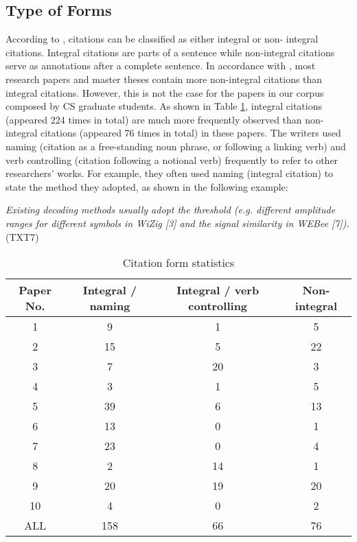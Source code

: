 \subsection{Type of Forms}
According to \citet{thompson_looking_2001}, citations can be classified as either integral or non- integral citations. Integral citations are parts of a sentence while non-integral citations serve as annotations after a complete sentence. In accordance with \citet{samraj_form_2013}, most research papers and master theses contain more non-integral citations than integral citations. However, this is not the case for the papers in our corpus composed by CS graduate students. As shown in Table \ref{tab:citation_form}, integral citations (appeared 224 times in total) are much more frequently observed than non-integral citations (appeared 76 times in total) in these papers. The writers used naming (citation as a free-standing noun phrase, or following a linking verb) and verb controlling (citation following a notional verb) frequently to refer to other researchers’ works. For example, they often used naming (integral citation) to state the method they adopted, as shown in the following example:

\textit{Existing decoding methods usually adopt the threshold (e.g. different amplitude ranges for different symbols in WiZig [3] and the signal similarity in WEBee [7]).} (TXT7)

\begin{table}[thb]
    \caption{Citation form statistics}
    \centering
      \begin{tabular}{cccc}
        \toprule[1.5pt]
        \textbf{Paper No.} & \textbf{Integral / naming} & \textbf{Integral / verb controlling} & \textbf{Non-integral} \\
        \midrule[1pt]
        1 & 9 & 1 & 5 \\
        2 & 15 & 5 & 22 \\
        3 & 7 & 20 & 3 \\ 
        4 & 3 & 1 & 5 \\
        5 & 39 & 6 & 13 \\
        6 & 13 & 0 & 1 \\
        7 & 23 & 0 & 4 \\
        8 & 2 & 14 & 1 \\
        9 & 20 & 19 & 20 \\
        10 & 4 & 0 & 2 \\ 
        ALL & 158 & 66 & 76 \\
        
      \bottomrule[1.5pt]
    \end{tabular}
    \label{tab:citation_form}
  \end{table}

